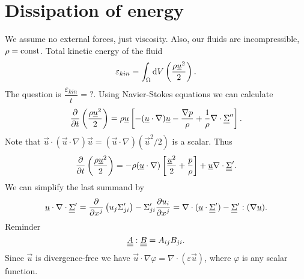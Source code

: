 \documentclass[../main.tex]{subfiles}
\begin{document}
    \section{Dissipation of energy}
    We assume no external forces, just viscosity.
    Also, our fluids are incompressible, $\rho = \textrm{const}$.
    Total kinetic energy of the fluid
    \begin{displaymath}
      \varepsilon_{kin} = \int_\Omega \mathrm{d} V \left( \frac{\rho \underline{u}^2}{2} \right).
    \end{displaymath}
    The question is $\dfrac{\varepsilon_{kin}}{t} = ?$.
    Using Navier-Stokes equations we can calculate
    \begin{displaymath}
      \frac{\partial }{\partial t} \left( \frac{\rho \underline{u}^2}{2}  \right) 
      = \rho \underline{u} \left[ - (\underline{u} \cdot \nabla) \underline{u} - \frac{\nabla p}{\rho} + \frac{1}{\rho} \nabla\cdot \underline{\underline{{\Sigma}}}''\right].
    \end{displaymath}
    Note that $\vec u \cdot (\vec u \cdot \nabla) \vec u = (\vec u\cdot \nabla) (\vec u^2 / 2)$ is a scalar.
    Thus
    \begin{displaymath}
      \frac{\partial }{\partial t} \left( \frac{\rho \underline{u}^2}{2}  \right)  
      =- \rho( \underline{u} \cdot \nabla ) \left[ \frac{\underline{u}^2}{2} + \frac{p}{\rho}\right] + \underline{u} \nabla\cdot \underline{\underline{{\Sigma}}}'.
    \end{displaymath}
    We can simplify the last summand by
    \begin{displaymath}
      \underline{u} \cdot \nabla\cdot \underline{\underline{{\Sigma}}}' = \frac{\partial }{\partial x^j} \left( u_j \Sigma'_{ji} \right) - \Sigma_{ji}' \frac{\partial u_i}{\partial x^j} 
      = \nabla\cdot(\underline{u} \cdot \underline{\underline{{\Sigma}}}') - \underline{\underline{{\Sigma}}}' : (\nabla \underline{u}).
    \end{displaymath}
    Reminder
    \begin{displaymath}
      \underline{\underline{{A}}} : \underline{\underline{{B}}} = A_{ij}B_{ji}.
    \end{displaymath}
    Since $\vec u$ is divergence-free we have $\vec u \cdot\nabla \varphi = \nabla \cdot (\varepsilon \vec u)$, where $\varphi$
    is any scalar function.
\end{document}
